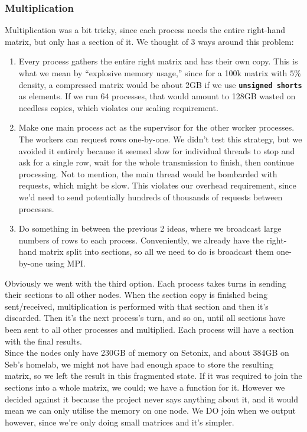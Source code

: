 \documentclass[11pt,leqno]{article}
\begin{document}
\begin{flushleft}
\subsubsection{Multiplication}\label{multiplication}

Multiplication was a bit tricky, since each process needs the entire
right-hand matrix, but only has a section of it. We thought of 3 ways
around this problem:
\begin{enumerate}[label=\textcolor{CtpMauve}{\arabic*.}]
\item Every process gathers the entire right matrix and has their own copy. This is what we mean by ``explosive memory usage,'' since for a 100k matrix with $5\%$ density, a compressed matrix would be about 2GB if we use \textbf{\texttt{unsigned shorts}} as elements. If we run $64$ processes, that would amount to 128GB wasted on needless copies, which violates our scaling requirement.

\item Make one main process act as the supervisor for the other worker processes. The workers can request rows one-by-one. We didn't test this strategy, but we avoided it entirely because it seemed slow for individual threads to stop and ask for a single row, wait for the whole transmission to finish, then continue processing. Not to mention, the main thread would be bombarded with requests, which might be slow. This violates our overhead requirement, since we'd need to send potentially hundreds of thousands of requests between processes.

\item Do something in between the previous 2 ideas, where we broadcast large numbers of rows to each process. Conveniently, we already have the right-hand matrix split into sections, so all we need to do is broadcast them one-by-one using MPI.
\end{enumerate}

Obviously we went with the third option. Each process takes turns in sending their sections to all other nodes. When the section copy is finished being sent/received, multiplication is performed with that section and then it's discarded. Then it's the next process's turn, and so on, until all sections have been sent to all other processes and multiplied. Each process will have a section with the final results. \\[2 ex]

Since the nodes only have 230GB of memory on Setonix, and about 384GB on Seb's homelab, we might not have had enough space to store the resulting matrix, so we left the result in this fragmented state. If it was required to join the sections into a whole matrix, we could; we have a function for it. However we decided against it because the project never says anything about it, and it would mean we can only utilise the memory on one node. We DO join when we output however, since we're only doing small matrices and it's simpler.  \\[2 ex]


\end{flushleft}
\end{document}
